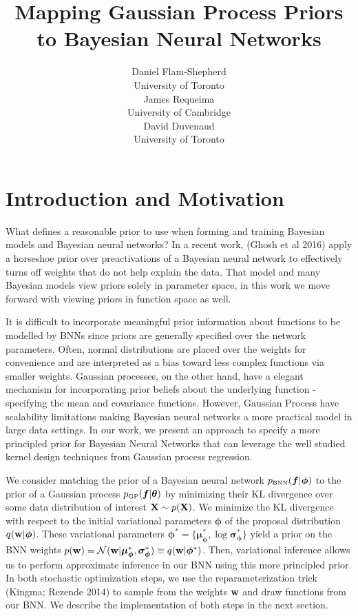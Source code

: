 \documentclass{article}
\title{Mapping Gaussian Process Priors
\\ to Bayesian Neural Networks}
\author{
  Daniel Flam-Shepherd \\
  University of Toronto \\
  \And
  James Requeima  \\
  University of Cambridge \\
  \AND
  David Duvenaud \\
  University of Toronto \\
}
\begin{document}

\maketitle

\section{Introduction and Motivation}
What defines a reasonable prior to use when forming and training Bayesian models 
and Bayesian neural networks? In a recent work, (Ghosh et al 2016) 
apply a horseshoe prior over preactivations of a Bayesian neural network to 
effectively turns off weights that do not help explain the data. That model and 
many Bayesian models view priors solely in parameter space, in this work we move 
forward with viewing priors in function space as well. 

It is difficult to incorporate meaningful prior information about functions to be 
modelled by BNNs since priors are generally specified over the network parameters. 
Often, normal distributions are placed over the weights for convenience and 
are interpreted as a bias toward less complex functions via smaller weights. 
Gaussian processes, on the other hand, have a elegant mechanism for incorporating 
prior beliefs about the underlying function - specifying the mean and covariance functions.
However, Gaussian Process have scalability limitations making Bayesian neural networks 
a more practical model in large data settings. 
In our work, we present an approach to specify a more principled prior for 
Bayesian Neural Networks that can leverage the well studied kernel design techniques from Gaussian process regression.


We consider matching the prior of a Bayesian neural network $\pbnn (\bm f |\bm \phi )$
to the prior of a Gaussian process $\pgp (\bm f | \bm \theta ) $ 
 by minimizing their KL divergence over 
some data distribution of interest $ \mathbf{X}  \sim p( \mathbf{X} )$. 
We minimize the KL divergence with respect to the initial variational parameters $\bm \phi$ 
of the proposal distribution $q( \mathbf{w}  |\bm \phi)$. 
These variational parameters 
$\bm \phi^* = \{ \bm \mu _{\bm \phi}^* , \log \bm \sigma _{\bm \phi} ^* \} $ 
yield a prior on the BNN weights 
$p( \mathbf{w} ) = \mathcal{N} ( \mathbf{w}  |\bm \mu _{\bm \phi}^* , \bm \sigma _{\bm \phi} ^* )\equiv q( \mathbf{w}  | \bm \phi ^*)$. 
Then, variational inference allows us to perform approximate inference in our BNN using this more 
principled prior. In both stochastic optimization steps, we use the reparameterization trick (Kingma; Rezende 2014) 
to sample from the weights $ \mathbf{w} $ and draw functions from our BNN. 
We describe the implementation of both steps in the next section. 
\end{document}
